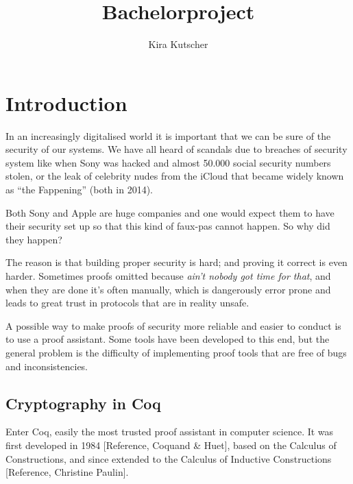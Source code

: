 \documentclass[titlepage]{article}
\title{Bachelorproject}
\author{Kira Kutscher}
\begin{document}
\maketitle

\newcommand\rml{$\mathcal{R}$\texttt{ml} }
\newcommand\M{\texttt{M}}


\tableofcontents
\newpage



\section{Introduction}
In an increasingly digitalised world it is important that we can be sure of the
security of our systems. We have all heard of scandals due to breaches of security
system like when Sony was hacked and almost 50.000 social security numbers stolen, or
the leak of celebrity nudes from the iCloud that became widely known as ``the
Fappening'' (both in 2014).

Both Sony and Apple are huge companies and one would expect them to have their
security set up so that this kind of faux-pas cannot happen. So why did they happen?

The reason is that building proper security is hard; and proving it correct is even
harder. Sometimes proofs omitted because \textit{ain't nobody got time for that}, and
when they are done it's often manually, which is dangerously error prone and leads to
great trust in protocols that are in reality unsafe.

A possible way to make proofs of security more reliable and easier to conduct is to
use a proof assistant. Some tools have been developed to this end, but the general
problem is the difficulty of implementing proof tools that are free of bugs and
inconsistencies. 

\subsection{Cryptography in Coq}
Enter Coq, easily the most trusted proof assistant in computer science. It was first
developed in 1984 [Reference, Coquand \& Huet], based on the Calculus of
Constructions, and since extended to the Calculus of Inductive Constructions
[Reference, Christine Paulin].
\end{document}
